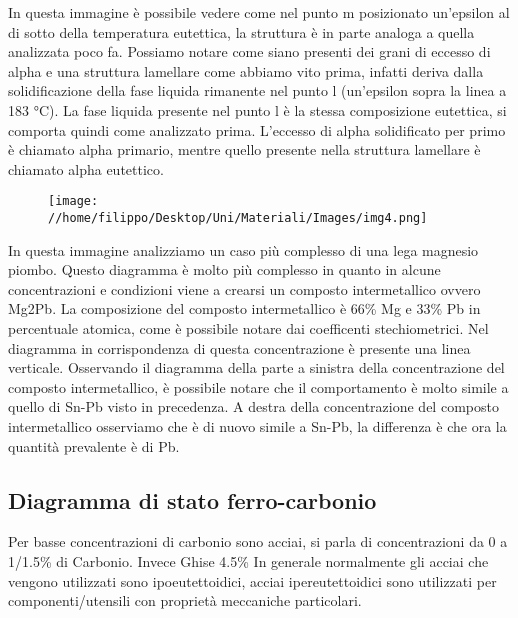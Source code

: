 \documentclass{article}%
\begin{document}
%
In questa immagine è possibile vedere come nel punto m posizionato un'epsilon al di sotto della temperatura eutettica, la struttura è in parte analoga a quella analizzata poco fa.\newline%
%
Possiamo notare come siano presenti dei grani di eccesso di alpha e una struttura lamellare come abbiamo vito prima, infatti deriva dalla solidificazione della fase liquida rimanente nel punto l (un'epsilon sopra la linea a 183 °C).\newline%
%
La fase liquida presente nel punto l è la stessa composizione eutettica, si comporta quindi come analizzato prima.\newline%
%
L'eccesso di alpha solidificato per primo è chiamato alpha primario, mentre quello presente nella struttura lamellare è chiamato alpha eutettico.\newline%
%
\newline%
%
\newline%
%


\begin{figure}[H]%
\centering%
\texttt{[image: //home/filippo/Desktop/Uni/Materiali/Images/img4.png]}%
\end{figure}

%
In questa immagine analizziamo un caso più complesso di una lega magnesio piombo.\newline%
%
Questo diagramma è molto più complesso in quanto in alcune concentrazioni e condizioni viene a crearsi un composto intermetallico ovvero Mg2Pb.\newline%
%
La composizione del composto intermetallico è 66\% Mg e 33\% Pb in percentuale atomica, come è possibile notare dai coefficenti stechiometrici.\newline%
%
Nel diagramma in corrispondenza di questa concentrazione è presente una linea verticale.\newline%
%
Osservando il diagramma della parte a sinistra della concentrazione del composto intermetallico, è possibile notare che il comportamento è molto simile a quello di Sn{-}Pb visto in precedenza.\newline%
%
\newline%
%
A destra della concentrazione del composto intermetallico osserviamo che è di nuovo simile a Sn{-}Pb, la differenza è che ora la quantità prevalente è di Pb.\newline%
%
\newline%

%
\subsection{ Diagramma di stato ferro{-}carbonio }%
\label{subsec:Diagrammadistatoferro{-}carbonio}%
Per basse concentrazioni di carbonio sono acciai, si parla di concentrazioni da 0 a 1/1.5\% di Carbonio. Invece Ghise 4.5\%\newline%
%
In generale normalmente gli acciai che vengono utilizzati sono ipoeutettoidici, acciai ipereutettoidici sono utilizzati per componenti/utensili con proprietà meccaniche particolari.\newline%
%
\newline%
%
\end{document}
